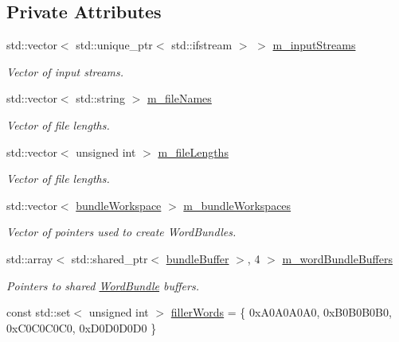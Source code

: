 \subsection*{Private Attributes}
\begin{DoxyCompactItemize}
\item 
std\+::vector$<$ std\+::unique\+\_\+ptr$<$ std\+::ifstream $>$ $>$ \hyperlink{class_file_reader_a8dfdb072d4bb1052a52d7be93fb44f07}{m\+\_\+input\+Streams}
\begin{DoxyCompactList}\small\item\em Vector of input streams. \end{DoxyCompactList}\item 
std\+::vector$<$ std\+::string $>$ \hyperlink{class_file_reader_ac1fd6ccb07797fa82caad2906c5a4fab}{m\+\_\+file\+Names}
\begin{DoxyCompactList}\small\item\em Vector of file lengths. \end{DoxyCompactList}\item 
std\+::vector$<$ unsigned int $>$ \hyperlink{class_file_reader_a7269438e7187e9abbdde1361a46d1fa6}{m\+\_\+file\+Lengths}
\begin{DoxyCompactList}\small\item\em Vector of file lengths. \end{DoxyCompactList}\item 
std\+::vector$<$ \hyperlink{class_file_reader_a7fb625dc45cee3256d37cc19c65cad86}{bundle\+Workspace} $>$ \hyperlink{class_file_reader_ab59c633bc2943dcea7c977585e7e48b3}{m\+\_\+bundle\+Workspaces}
\begin{DoxyCompactList}\small\item\em Vector of pointers used to create Word\+Bundles. \end{DoxyCompactList}\item 
std\+::array$<$ std\+::shared\+\_\+ptr$<$ \hyperlink{class_file_reader_ac755c1e271610c2c12a7fc5b55cc048b}{bundle\+Buffer} $>$, 4 $>$ \hyperlink{class_file_reader_a038d1362d7e0458b3450ab8584eab688}{m\+\_\+word\+Bundle\+Buffers}
\begin{DoxyCompactList}\small\item\em Pointers to shared \hyperlink{class_word_bundle}{Word\+Bundle} buffers. \end{DoxyCompactList}\item 
const std\+::set$<$ unsigned int $>$ \hyperlink{class_file_reader_a7a0bb5e7cb117f6a415f005665893509}{filler\+Words} = \{ 0x\+A0\+A0\+A0\+A0, 0x\+B0\+B0\+B0\+B0, 0x\+C0\+C0\+C0\+C0, 0x\+D0\+D0\+D0\+D0 \}
\end{DoxyCompactItemize}


